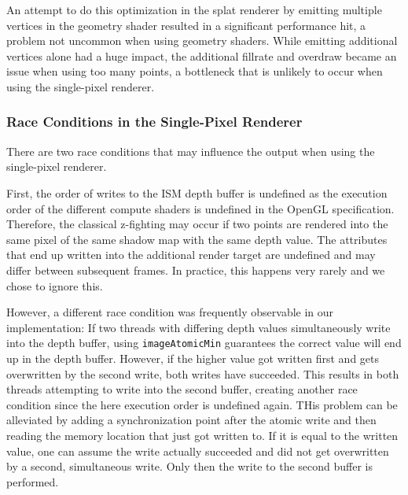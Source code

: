 
 An attempt to do this optimization in the splat renderer by emitting multiple vertices in the geometry shader resulted in a significant performance hit, a problem not uncommon when using geometry shaders. While emitting additional vertices alone had a huge impact, the additional fillrate and overdraw became an issue when using too many points, a bottleneck that is unlikely to occur when using the single-pixel renderer.


 \subsubsection{Race Conditions in the Single-Pixel Renderer}

 There are two race conditions that may influence the output when using the single-pixel renderer.

 First, the order of writes to the ISM depth buffer is undefined as the execution order of the different compute shaders is undefined in the OpenGL specification. Therefore, the classical z-fighting may occur if two points are rendered into the same pixel of the same shadow map with the same depth value. The attributes that end up written into the additional render target are undefined and may differ between subsequent frames. In practice, this happens very rarely and we chose to ignore this.

 However, a different race condition was frequently observable in our implementation:
 If two threads with differing depth values simultaneously write into the depth buffer, using \texttt{imageAtomicMin} guarantees the correct value will end up in the depth buffer. However, if the higher value got written first and gets overwritten by the second write, both writes have succeeded. This results in both threads attempting to write into the second buffer, creating another race condition since the here execution order is undefined again. THis problem can be alleviated by adding a synchronization point after the atomic write and then reading the memory location that just got written to. If it is equal to the written value, one can assume the write actually succeeded and did not get overwritten by a second, simultaneous write. Only then the write to the second buffer is performed.

